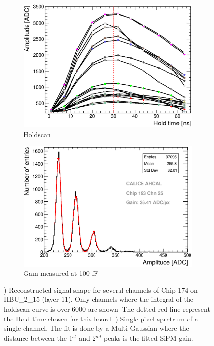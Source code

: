 \begin{figure}[htbp!]
  \centering
  \begin{subfigure}[t]{0.49\textwidth}
    \includegraphics[width=1.\linewidth]{../Thesis_Plots/Commissioning/Plots/Holdscan_HBU2_15.eps}
    \caption{Holdscan} \label{fig:Holdscan}
  \end{subfigure}
  \hfill
  \begin{subfigure}[t]{0.49\textwidth}
    \includegraphics[width=1.\linewidth]{../Thesis_Plots/Commissioning/Plots/Gain100fF_MainzHBU4.eps}
    \caption{Gain measured at 100 fF} \label{fig:Gain100fF}
  \end{subfigure}
  \caption{) Reconstructed signal shape for several channels of Chip 174 on HBU\_{}2\_{}15 (layer 11). Only channels where the integral of the holdscan curve is over 6000 are shown. The dotted red line represent the Hold time chosen for this board. ) Single pixel spectrum of a single channel. The fit is done by a Multi-Gaussian where the distance between the 1$^{st}$ and 2$^{nd}$ peaks is the fitted SiPM gain.}
\end{figure}

